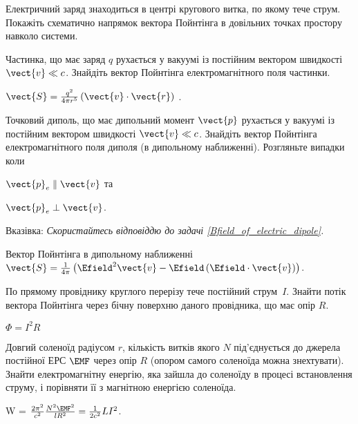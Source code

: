 \begin{problem}
    Електричний заряд знаходиться в центрі кругового витка, по якому тече струм. Покажіть схематично напрямок вектора Пойнтінга в довільних точках простору навколо системи.
\end{problem}

\begin{problem}
    Частинка, що має заряд $q$ рухається у вакуумі із постійним вектором швидкості $\vect{v} \ll c$. Знайдіть вектор Пойнтінга електромагнітного поля частинки.
\begin{solution}
	$\vect{S} = \frac{q^2}{4\pi r^5} \left( \vect{v} \cdot \vect{r}\right)$ .
\end{solution}
\end{problem}

\begin{problem}
    Точковий диполь, що має дипольний момент $\vect{p}$ рухається у вакуумі із постійним вектором швидкості $\vect{v} \ll c$. Знайдіть вектор Пойнтінга електромагнітного поля диполя (в дипольному наближенні). Розгляньте випадки коли 
	\begin{enumerate*}[label=\alph*)]
		\item 	$\vect{p}_e \parallel \vect{v}$ та
		\item   $\vect{p}_e \perp \vect{v}$. 
	\end{enumerate*} 

	Вказівка: \emph{Скористайтесь відповіддю до задачі \ref{Bfield_of_electric_dipole}.}
\begin{solution}
	Вектор Пойнтінга в дипольному наближенні $\vect{S} = \frac{1}{4\pi} \left( \Efield^2 \vect{v} - \Efield\left(\Efield\cdot\vect{v} \right) \right) $. 
\end{solution}
\end{problem}

\begin{problem}%
По прямому провіднику круглого перерізу тече постійний струм~$I$. Знайти потік вектора Пойнтінга через бічну поверхню даного провідника, що має опір $R$.
\begin{solution}
	$\Phi = I^2R$
\end{solution}
\end{problem}

\begin{problem}
    Довгий соленоїд радіусом $r$, кількість витків якого  $N$ під'єднується до джерела постійної ЕРС $\EMF$ через опір $R$ (опором самого соленоїда можна знехтувати). Знайти електромагнітну енергію, яка зайшла до соленоїду в процесі встановлення струму, і порівняти її з магнітною енергією соленоїда.
\begin{solution}
	W = $\frac{2\pi^2}{c^2} \frac{N^2\EMF^2}{lR^2} = \frac{1}{2c^2} LI^2$.
\end{solution}
\end{problem}

